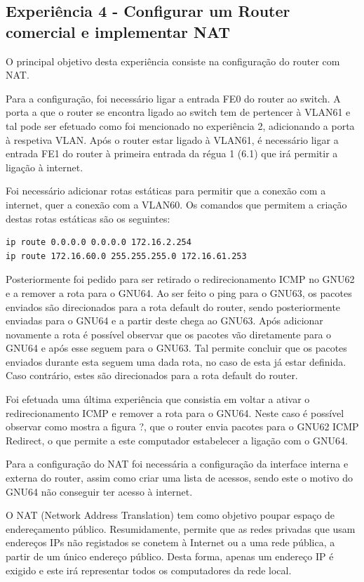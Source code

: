 \documentclass[article, a4paper, 11pt, oneside]{memoir}
\begin{document}
\subsection{Experiência 4 - Configurar um Router comercial e implementar NAT}

O principal objetivo desta experiência consiste na configuração do router com NAT.

Para a configuração, foi necessário ligar a entrada FE0 do router ao switch.
A porta a que o router se encontra ligado ao switch tem de pertencer à VLAN61 e tal pode ser efetuado como foi
mencionado no experiência 2, adicionando a porta à respetiva VLAN. Após o router estar ligado à VLAN61, 
é necessário ligar a entrada FE1 do router à primeira entrada da régua 1 (6.1) que irá permitir a ligação à internet.

Foi necessário adicionar rotas estáticas para permitir que a conexão com a internet, quer a conexão com a VLAN60.
Os comandos que permitem a criação destas rotas estáticas são os seguintes:

\begin{lstlisting} 
ip route 0.0.0.0 0.0.0.0 172.16.2.254
ip route 172.16.60.0 255.255.255.0 172.16.61.253
\end{lstlisting} 

Posteriormente foi pedido para ser retirado o redirecionamento ICMP no GNU62 e a remover a rota para o GNU64.
Ao ser feito o ping para o GNU63, os pacotes enviados são direcionados para a rota default do router, sendo posteriormente enviadas para o GNU64 e a partir deste
chega ao GNU63. Após adicionar novamente a rota é possível observar que os pacotes vão diretamente para o GNU64 e após esse seguem para o GNU63. Tal
permite concluir que os pacotes enviados durante esta seguem uma dada rota, no caso de esta já estar definida.
Caso contrário, estes são direcionados para a rota default do router.

Foi efetuada uma última experiência que consistia em voltar a ativar o redirecionamento ICMP e remover a rota para o GNU64. Neste caso é possível observar como
mostra a figura ?, que o router envia pacotes para o GNU62 ICMP Redirect, o que permite a este computador estabelecer a ligação com o GNU64.

Para a configuração do NAT foi necessária a configuração da interface interna e externa do router, assim como criar uma lista de acessos, sendo este o motivo
do GNU64 não conseguir ter acesso à internet.

O NAT (Network Address Translation) tem como objetivo poupar espaço de endereçamento público.
Resumidamente, permite que as redes privadas que usam endereços IPs não registados se conetem à Internet ou a uma rede pública,
a partir de um único endereço público. 
Desta forma, apenas um endereço IP é exigido e este irá representar todos os computadores da rede local.
 
\end{document}
